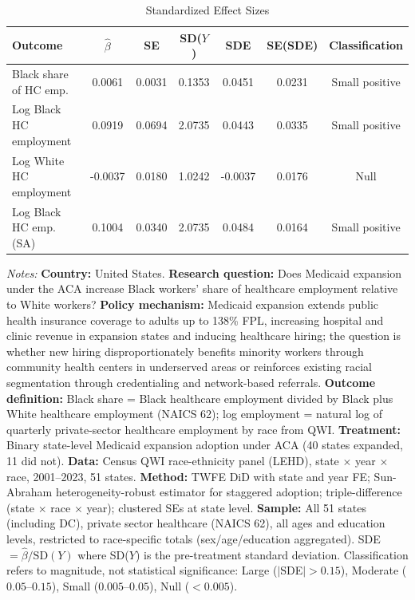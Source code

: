 \begin{table}[htbp]
\centering
\caption{Standardized Effect Sizes}
\label{tab:sde}
\small
\begin{tabular}{lcccccc}
\toprule
Outcome & $\hat{\beta}$ & SE & SD($Y$) & SDE & SE(SDE) & Classification \\
\midrule
Black share of HC emp. & 0.0061 & 0.0031 & 0.1353 & 0.0451 & 0.0231 & Small positive \\
Log Black HC employment & 0.0919 & 0.0694 & 2.0735 & 0.0443 & 0.0335 & Small positive \\
Log White HC employment & -0.0037 & 0.0180 & 1.0242 & -0.0037 & 0.0176 & Null \\
Log Black HC emp. (SA) & 0.1004 & 0.0340 & 2.0735 & 0.0484 & 0.0164 & Small positive \\
\bottomrule
\end{tabular}
\begin{tablenotes}
\small
\item \textit{Notes:} \textbf{Country:} United States. \textbf{Research question:} Does Medicaid expansion under the ACA increase Black workers' share of healthcare employment relative to White workers? \textbf{Policy mechanism:} Medicaid expansion extends public health insurance coverage to adults up to 138\% FPL, increasing hospital and clinic revenue in expansion states and inducing healthcare hiring; the question is whether new hiring disproportionately benefits minority workers through community health centers in underserved areas or reinforces existing racial segmentation through credentialing and network-based referrals. \textbf{Outcome definition:} Black share = Black healthcare employment divided by Black plus White healthcare employment (NAICS 62); log employment = natural log of quarterly private-sector healthcare employment by race from QWI. \textbf{Treatment:} Binary state-level Medicaid expansion adoption under ACA (40 states expanded, 11 did not). \textbf{Data:} Census QWI race-ethnicity panel (LEHD), state $\times$ year $\times$ race, 2001--2023, 51 states. \textbf{Method:} TWFE DiD with state and year FE; Sun-Abraham heterogeneity-robust estimator for staggered adoption; triple-difference (state $\times$ race $\times$ year); clustered SEs at state level. \textbf{Sample:} All 51 states (including DC), private sector healthcare (NAICS 62), all ages and education levels, restricted to race-specific totals (sex/age/education aggregated). SDE $= \hat{\beta} / \text{SD}(Y)$ where SD($Y$) is the pre-treatment standard deviation. Classification refers to magnitude, not statistical significance: Large ($|$SDE$| > 0.15$), Moderate ($0.05$--$0.15$), Small ($0.005$--$0.05$), Null ($< 0.005$).
\end{tablenotes}
\end{table}
